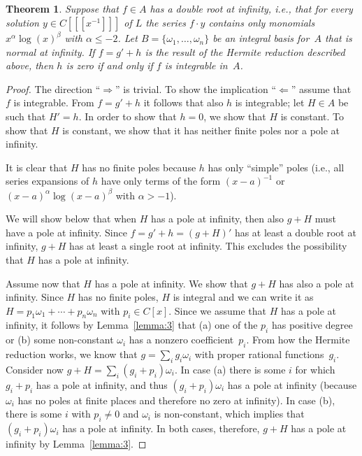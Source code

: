 \documentclass{sig-alternate}
\newtheorem{theorem}{Theorem}
\begin{document}
\begin{theorem}\label{thm:intiff0}
  Suppose that $f\in A$ has a double root at infinity,
  i.e., that for every solution $y\in C[[[x^{-1}]]]$ of $L$
  the series $f\cdot y$ contains only monomials $x^\alpha\log(x)^\beta$ with $\alpha\leq-2$.
  Let $B=\{\omega_1,\ldots,\omega_n\}$ be an integral basis for~$A$
that is normal at infinity.
If $f=g'+h$ is the result of the Hermite reduction described above,
then $h$ is zero if and only if $f$ is integrable in~$A$.
\end{theorem}
\begin{proof}
The direction ``$\Rightarrow$'' is trivial. To show the implication
``$\Leftarrow$'' assume that $f$ is integrable. From $f=g'+h$ it follows that
also $h$ is integrable; let $H\in A$ be such that $H'=h$.  In order to show
that $h=0$, we show that $H$ is constant.  To show that $H$ is constant, we
show that it has neither finite poles nor a pole at infinity.

It is clear that $H$ has no finite poles because $h$ has only ``simple'' poles
(i.e., all series expansions of $h$ have only terms of the form
$(x-a)^{-1}$ or $(x-a)^\alpha\log(x-a)^\beta$ with $\alpha>-1$).

We will show below that when $H$ has a pole at infinity, then also $g+H$ must
have a pole at infinity.  Since $f=g'+h=(g+H)'$ has at least a double root at
infinity, $g+H$ has at least a single root at infinity. This excludes the
possibility that $H$ has a pole at infinity.

Assume now that $H$ has a pole at infinity. We show that $g+H$ has also a pole at infinity.
Since $H$ has no finite poles, $H$ is integral and we can write it as
$H=p_1\omega_1+\cdots+p_n\omega_n$ with $p_i\in C[x]$.
Since we assume that $H$ has a pole at infinity, it follows by Lemma~\ref{lemma:3} that
(a) one of the $p_i$ has positive degree or
(b) some non-constant $\omega_i$ has a nonzero coefficient~$p_i$.
From how the Hermite reduction works, we know that $g=\sum_i g_i\omega_i$
with proper rational functions~$g_i$. Consider now $g+H=\sum_i (g_i+p_i)\omega_i$.
In case (a) there is some $i$ for which $g_i+p_i$ has a pole at infinity,
and thus $(g_i+p_i)\omega_i$ has a pole at infinity (because $\omega_i$ has
no poles at finite places and therefore no zero at infinity).
In case (b), there is some $i$ with $p_i\neq0$ and $\omega_i$ is non-constant,
which implies that $(g_i+p_i)\omega_i$ has a pole at infinity.
In both cases, therefore, $g+H$ has a pole at infinity by Lemma~\ref{lemma:3}.
\end{proof}
\end{document}
